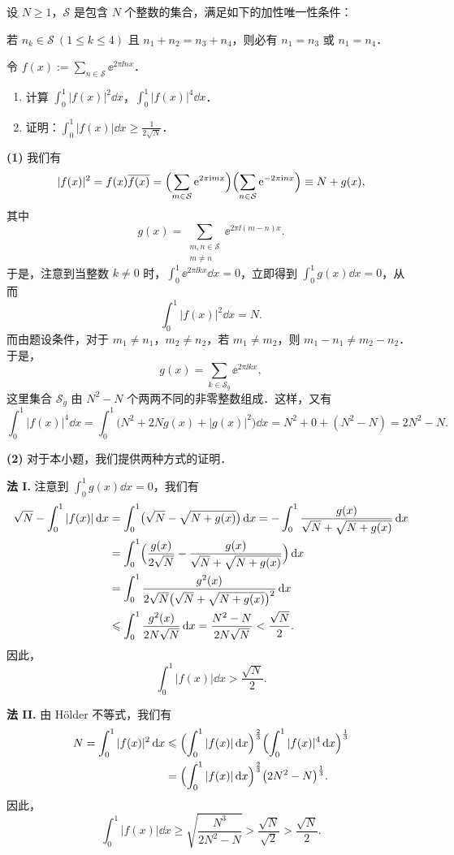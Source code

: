 设 $N\geqslant 1$，$\mathcal{S}$ 是包含 $N$ 个整数的集合，满足如下的加性唯一性条件：

若 $n_k\in\mathcal{S}\ (1\leqslant k\leqslant 4)$ 且 $n_1+n_2=n_3+n_4$，则必有 $n_1=n_3$ 或 $n_1=n_4$．

令 $f(x):=\sum\limits_{n\in\mathcal{S}}\ee^{2\pi\ii nx}$．
\begin{enumerate}[label=(\arabic*)]
  \item 计算 $\displaystyle\int_0^1|f(x)|^2\dd x$，$\displaystyle\int_0^1|f(x)|^4\dd x$．
  \item 证明：$\displaystyle\int_0^1|f(x)|\dd x\geqslant\frac{1}{2\sqrt{N}}$．
\end{enumerate}
\begin{solution}
\textbf{(1)} 我们有
\[
|f(x)|^2=f(x)\overline{f(x)}
=\Bigl(\sum_{m\in\mathcal{S}}\mathrm{e}^{2\pi\mathrm{i} mx}\Bigr)\Bigl(\sum_{n\in\mathcal{S}}\mathrm{e}^{-2\pi\mathrm{i} nx}\Bigr)
\equiv N+g(x),
\]
其中
\[
g(x)=\sum_{\substack{m,n\in\mathcal{S}\\ m\neq n}}\ee^{2\pi\ii(m-n)x}.
\]
于是，注意到当整数 $k\neq 0$ 时，$\displaystyle\int_0^1\ee^{2\pi\ii kx}\dd x=0$，立即得到 $\displaystyle\int_0^1 g(x)\dd x=0$，从而
\[
\int_0^1|f(x)|^2\dd x=N.
\]
而由题设条件，对于 $m_1\neq n_1$，$m_2\neq n_2$，若 $m_1\neq m_2$，则 $m_1-n_1\neq m_2-n_2$．于是，
\[
g(x)=\sum_{k\in\mathcal{S}_g}\ee^{2\pi\ii kx},
\]
这里集合 $\mathcal{S}_g$ 由 $N^2-N$ 个两两不同的非零整数组成．这样，又有
\[
\int_0^1|f(x)|^4\dd x
=\int_0^1\bigl(N^2+2Ng(x)+|g(x)|^2\bigr)\dd x
=N^2+0+(N^2-N)=2N^2-N.
\]

\textbf{(2)} 对于本小题，我们提供两种方式的证明．

\textbf{法 I.} 注意到 $\displaystyle\int_0^1 g(x)\dd x=0$，我们有
\begin{align*}
\sqrt{N}-\int_0^1|f(x)|\,\mathrm{d} x
&=\int_0^1\bigl(\sqrt{N}-\sqrt{N+g(x)}\bigr)\,\mathrm{d} x
=-\int_0^1\frac{g(x)}{\sqrt{N}+\sqrt{N+g(x)}}\,\mathrm{d} x\\
&=\int_0^1\Bigl(\frac{g(x)}{2\sqrt{N}}-\frac{g(x)}{\sqrt{N}+\sqrt{N+g(x)}}\Bigr)\,\mathrm{d} x\\
&=\int_0^1\frac{g^2(x)}{2\sqrt{N}\bigl(\sqrt{N}+\sqrt{N+g(x)}\bigr)^2}\,\mathrm{d} x\\
&\leqslant\int_0^1\frac{g^2(x)}{2N\sqrt{N}}\,\mathrm{d} x
=\frac{N^2-N}{2N\sqrt{N}}<\frac{\sqrt{N}}{2}.
\end{align*}
因此，
\[
\int_0^1|f(x)|\dd x>\frac{\sqrt{N}}{2}.
\]

\textbf{法 II.} 由 H\"older 不等式，我们有
\begin{align*}
N=\int_0^1|f(x)|^2\,\mathrm{d} x
&\leqslant\Bigl(\int_0^1|f(x)|\,\mathrm{d} x\Bigr)^{\frac23}\Bigl(\int_0^1|f(x)|^4\,\mathrm{d} x\Bigr)^{\frac13}\\
&=\Bigl(\int_0^1|f(x)|\,\mathrm{d} x\Bigr)^{\frac23}\bigl(2N^2-N\bigr)^{\frac13}.
\end{align*}
因此，
\[
\int_0^1|f(x)|\dd x\geqslant\sqrt{\frac{N^3}{2N^2-N}}>\frac{\sqrt{N}}{\sqrt{2}}>\frac{\sqrt{N}}{2}.
\]
\end{solution}

